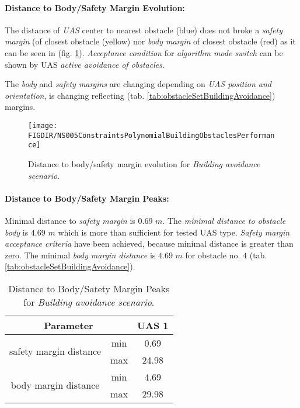 \noindent\paragraph{Distance to Body/Safety Margin Evolution:} The distance of \emph{UAS} center to nearest obstacle (blue) does not broke a \emph{safety margin} (of closest obstacle (yellow)  nor \emph{body margin} of closest obstacle (red) as it can be seen in (fig. \ref{fig:testCaseBuildingAvoidancePerformance}). \emph{Acceptance condition} for \emph{algorithm mode switch} can be shown by UAS \emph{active avoidance of obstacles}.

\begin{note}
The \emph{body} and \emph{safety margins} are changing depending on \emph{UAS position and orientation}, is changing reflecting (tab. \ref{tab:obstacleSetBuildingAvoidance}) margins. 
\end{note}


\begin{figure}[H]
	\centering
	\texttt{[image: \\FIGDIR/NS005ConstraintsPolynomialBuildingObstaclesPerformance]} 
	\caption{Distance to body/safety margin evolution for \emph{Building avoidance scenario}.}
	\label{fig:testCaseBuildingAvoidancePerformance}
\end{figure}


\noindent\paragraph{Distance to Body/Safety Margin Peaks:} Minimal distance to \emph{safety margin} is $0.69$ $m$. The \emph{minimal distance to obstacle body} is $4.69$ $m$ which is more than sufficient for tested UAS type. \emph{Safety margin acceptance criteria} have been achieved, because minimal distance is greater than zero. The minimal \emph{body margin distance} is $4.69$ $m$ for obstacle no. $4$ (tab. \ref{tab:obstacleSetBuildingAvoidance}).

\begin{table}[H]
	\centering
	\begin{tabular}{c|c||c}
	\multicolumn{2}{c||}{Parameter} & UAS 1 \\\hline\hline
	\multirow{2}{*}{safety margin distance} & min & 0.69  \\\cline{2-3}
											& max & 24.98 \\\hline
	\multirow{2}{*}{body margin distance}   & min & 4.69  \\\cline{2-3}
											& max & 29.98 
	\end{tabular}
	\caption{Distance to Body/Satety Margin Peaks for \emph{Building avoidance scenario}.}
	\label{tab:testCaseBuildingAvoidanceSafetyAndBodyMarginDistances}
\end{table}

